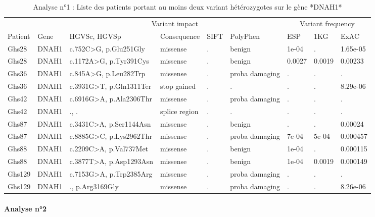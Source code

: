 \documentclass[12pt,twoside]{reedthesis}
\theoremstyle{definition}
\theoremstyle{definition}
\theoremstyle{remark}
\begin{document}
  \begin{landscape}
  \begin{longtable}[t]{lllllllll}
  \caption{\label{tab:tabdnah1low}Analyse n°1 : Liste des patients portant au moins deux variant hétérozygotes sur le gène *DNAH1*}\\
  \toprule
  \multicolumn{1}{c}{ } & \multicolumn{1}{c}{ } & \multicolumn{4}{c}{Variant impact} & \multicolumn{3}{c}{Variant frequency} \\
  \cmidrule(l{2pt}r{2pt}){3-6} \cmidrule(l{2pt}r{2pt}){7-9}
  Patient & Gene & HGVSc, HGVSp & Consequence & SIFT & PolyPhen & ESP & 1KG & ExAC\\
  \midrule
  Ghs28 & DNAH1 & c.752C>G, p.Glu251Gly & missense & . & benign & 1e-04 & . & 1.65e-05\\
  Ghs28 & DNAH1 & c.1172A>G, p.Tyr391Cys & missense & . & benign & 0.0027 & 0.0019 & 0.00233\\
  Ghs36 & DNAH1 & c.845A>G, p.Leu282Trp & missense & . & proba damaging & . & . & .\\
  Ghs36 & DNAH1 & c.3931G>T, p.Gln1311Ter & stop gained & . & . & . & . & 8.29e-06\\
  Ghs42 & DNAH1 & c.6916G>A, p.Ala2306Thr & missense & . & proba damaging & . & . & .\\
  \addlinespace
  Ghs42 & DNAH1 & ., . & splice region & . & . & . & . & .\\
  Ghs87 & DNAH1 & c.3431C>A, p.Ser1144Asn & missense & . & benign & . & . & 0.00024\\
  Ghs87 & DNAH1 & c.8885G>C, p.Lys2962Thr & missense & . & proba damaging & 7e-04 & 5e-04 & 0.000457\\
  Ghs88 & DNAH1 & c.2209C>A, p.Val737Met & missense & . & benign & 1e-04 & . & 0.000115\\
  Ghs88 & DNAH1 & c.3877T>A, p.Asp1293Asn & missense & . & benign & 1e-04 & 0.0019 & 0.000149\\
  \addlinespace
  Ghs129 & DNAH1 & c.7153G>A, p.Trp2385Arg & missense & . & proba damaging & . & . & .\\
  Ghs129 & DNAH1 & ., p.Arg3169Gly & missense & . & proba damaging & . & . & 8.26e-06\\
  \bottomrule
  \end{longtable}
  \end{landscape}
  
  \newpage
  
  \paragraph{Analyse n°2}\label{analyse-n2}
  
\end{document}
